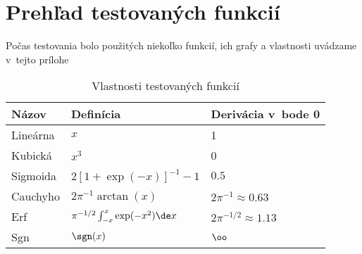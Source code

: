 \section{Prehľad testovaných funkcií}
Počas testovania bolo použitých niekoľko funkcií, ich grafy a vlastnosti
uvádzame v~tejto prílohe

\begin{table}[H]
\centering
\begin{tabular}{lll}
\toprule
Názov&Definícia&Derivácia v~bode 0\\
\midrule
Lineárna&$x$&1\\
Kubická&$x^3$&0\\
Sigmoida&$2[1+\exp(-x)]^{-1}-1$&$0.5$\\
Cauchyho&$2\pi^{-1}\arctan(x)$&$2\pi^{-1}\approx 0.63$\\
Erf&$\pi^{-1/2}\int_{-x}^x \exp(-x^2)\de x$ &$2\pi^{-1/2}\approx 1.13$\\
Sgn&$\sgn(x)$&$\oo$\\
\bottomrule

\end{tabular}
\caption{Vlastnosti testovaných funkcií}
\label{zoznamFunkcii}
\end{table}

\def\path{grafy/prehlad_funkcii/}%
